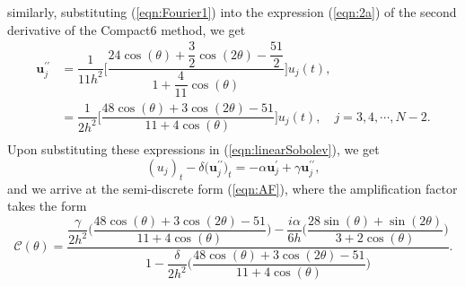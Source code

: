 \documentclass[11pt,a4paper]{amsart}
\theoremstyle{plain}
\theoremstyle{definition}
\theoremstyle{remark}
\numberwithin{equation}{section}
\begin{document}
similarly, substituting (\ref{eqn:Fourier1}) into the expression (\ref{eqn:2a}) of the second derivative of the Compact6 method, we get
\begin{equation}
     \begin{aligned}
              \mathbf{u}^{\prime\prime}_j &= \dfrac{1}{11h^2} \biggl[\dfrac{24 \cos(\theta) + \dfrac{3}{2} \cos(2\theta) - \dfrac{51}{2}}{1+\dfrac{4}{11} \cos(\theta)} \biggr] u_j(t),\\
               &= \dfrac{1}{2h^2} \biggl[\dfrac{48 \cos(\theta) + 3 \cos(2\theta) - 51}{11+4 \cos(\theta)} \biggr] u_j(t), \quad j = 3,4,\cdots, N-2. \\
        \end{aligned}
\end{equation}
Upon substituting these expressions in (\ref{eqn:linearSobolev}), we get
\begin{equation}
    (u_j)_t-\delta \bigl( \mathbf{u}_j^{\prime\prime}\bigr)_t = -\alpha  \mathbf{u}_j^{\prime} + \gamma \mathbf{u}_j^{\prime\prime}, 
\end{equation}
and we arrive at the semi-discrete form (\ref{eqn:AF}), where the amplification factor takes the form
\begin{equation}
    \mathcal{C}(\theta)=\displaystyle \dfrac{\dfrac{\gamma}{2h^2} \biggl(\dfrac{48 \cos(\theta) + 3 \cos(2\theta) - 51}{11+4 \cos(\theta)} \biggr) - \dfrac{i \alpha}{6h} \biggl(\dfrac{28 \sin(\theta) + \sin(2\theta)}{3+2 \cos(\theta)} \biggr)}{1-\dfrac{\delta}{2h^2} \biggl(\dfrac{48 \cos(\theta) + 3 \cos(2\theta) - 51}{11+4 \cos(\theta)} \biggr)}.
\end{equation}
\end{document}
